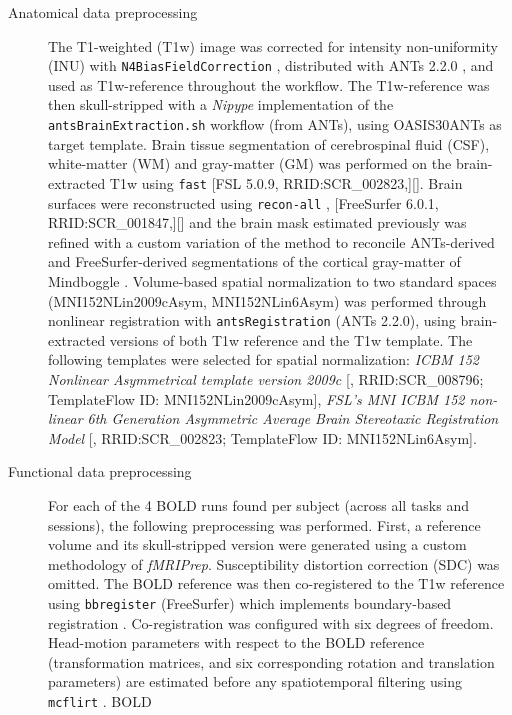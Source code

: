 \documentclass[10pt,letterpaper]{article}
\begin{document}
\begin{description}
\item[Anatomical data preprocessing]
The T1-weighted (T1w) image was corrected for intensity non-uniformity
(INU) with \texttt{N4BiasFieldCorrection} \cite{n4}, distributed with
ANTs 2.2.0 \cite[RRID:SCR\_004757]{ants}, and used as T1w-reference
throughout the workflow. The T1w-reference was then skull-stripped with
a \emph{Nipype} implementation of the \texttt{antsBrainExtraction.sh}
workflow (from ANTs), using OASIS30ANTs as target template. Brain tissue
segmentation of cerebrospinal fluid (CSF), white-matter (WM) and
gray-matter (GM) was performed on the brain-extracted T1w using
\texttt{fast} \cite{fsl_fast} [FSL 5.0.9, RRID:SCR\_002823,][]. Brain
surfaces were reconstructed using \texttt{recon-all} \cite{fs_reconall},
[FreeSurfer 6.0.1, RRID:SCR\_001847,][] and the brain mask estimated
previously was refined with a custom variation of the method to
reconcile ANTs-derived and FreeSurfer-derived segmentations of the
cortical gray-matter of Mindboggle
\cite[RRID:SCR\_002438,]{mindboggle}. Volume-based spatial
normalization to two standard spaces (MNI152NLin2009cAsym,
MNI152NLin6Asym) was performed through nonlinear registration with
\texttt{antsRegistration} (ANTs 2.2.0), using brain-extracted versions
of both T1w reference and the T1w template. The following templates were
selected for spatial normalization: \emph{ICBM 152 Nonlinear
Asymmetrical template version 2009c} {[}\cite{mni152nlin2009casym},
RRID:SCR\_008796; TemplateFlow ID: MNI152NLin2009cAsym{]}, \emph{FSL's
MNI ICBM 152 non-linear 6th Generation Asymmetric Average Brain
Stereotaxic Registration Model} {[}\cite{mni152nlin6asym},
RRID:SCR\_002823; TemplateFlow ID: MNI152NLin6Asym{]}.
\item[Functional data preprocessing]
For each of the 4 BOLD runs found per subject (across all tasks and
sessions), the following preprocessing was performed. First, a reference
volume and its skull-stripped version were generated using a custom
methodology of \emph{fMRIPrep}. Susceptibility distortion correction
(SDC) was omitted. The BOLD reference was then co-registered to the T1w
reference using \texttt{bbregister} (FreeSurfer) which implements
boundary-based registration \cite{bbr}. Co-registration was configured
with six degrees of freedom. Head-motion parameters with respect to the
BOLD reference (transformation matrices, and six corresponding rotation
and translation parameters) are estimated before any spatiotemporal
filtering using \texttt{mcflirt} \cite[FSL 5.0.9,]{mcflirt}. BOLD

\end{description}
\end{document}
